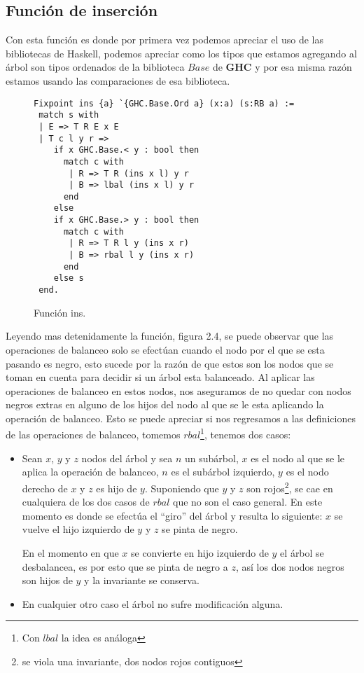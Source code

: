 \documentclass[letterpaper,12pt,oneside]{book}
\theoremstyle{plain}
\theoremstyle{definition}
\theoremstyle{remark}
\begin{document}
\subsection {Funci\'on de inserci\'on}
Con esta funci\'on es donde por primera vez podemos apreciar el uso de las  bibliotecas de Haskell, 
podemos apreciar como los tipos que estamos agregando al \'arbol son tipos ordenados de la biblioteca 
$Base$ de \textbf{GHC} y por esa misma raz\'on estamos usando las comparaciones de esa biblioteca.
\begin{figure}
\centering 
\captionsetup{justification=centering}
\begin{verbatim}
Fixpoint ins {a} `{GHC.Base.Ord a} (x:a) (s:RB a) :=
 match s with
 | E => T R E x E
 | T c l y r =>
    if x GHC.Base.< y : bool then 
      match c with
       | R => T R (ins x l) y r
       | B => lbal (ins x l) y r
      end
    else 
    if x GHC.Base.> y : bool then 
      match c with
       | R => T R l y (ins x r)
       | B => rbal l y (ins x r)
      end
    else s
 end.
\end{verbatim}
\caption{Funci\'on ins.}
\end{figure}

Leyendo mas detenidamente la funci\'on, figura 2.4, se puede observar que las operaciones de balanceo 
solo se efectúan cuando el nodo por el que se esta pasando es negro, esto sucede por la raz\'on de que 
estos son los nodos  que se toman en cuenta para decidir si un \'arbol esta balanceado. Al aplicar las 
operaciones de balanceo en estos nodos, nos aseguramos de no quedar con nodos negros extras en alguno de 
los hijos del nodo al que se le esta aplicando la operación de balanceo. Esto se puede apreciar si nos 
regresamos a las definiciones de las operaciones de balanceo, tomemos $rbal$\footnote{Con $lbal$ la idea 
es an\'aloga}, tenemos dos casos:

\begin{itemize}
    \item Sean $x$, $y$ y $z$ nodos del \'arbol y sea $n$ un subárbol, $x$ es el nodo al que se le aplica
    la operaci\'on de balanceo, $n$ es el subárbol izquierdo, $y$ es el nodo derecho  de $x$ y $z$ es 
    hijo de $y$. Suponiendo que $y$ y $z$ son rojos\footnote{se viola una invariante, dos nodos rojos 
    contiguos}, se cae en cualquiera de los dos casos de $rbal$ que no son el caso general. En este 
    momento es donde se efectúa el ``giro'' del árbol y resulta lo siguiente: $x$ se vuelve el hijo 
    izquierdo de $y$ y $z$ se pinta de negro.
    
    En el momento en que $x$ se convierte en hijo izquierdo de $y$ el \'arbol se desbalancea, es por esto
    que se pinta de negro a $z$, así los dos nodos negros son hijos de $y$ y la invariante se conserva.
    \item En cualquier otro caso el \'arbol no sufre modificaci\'on alguna.
\end{itemize}{}
\end{document}
